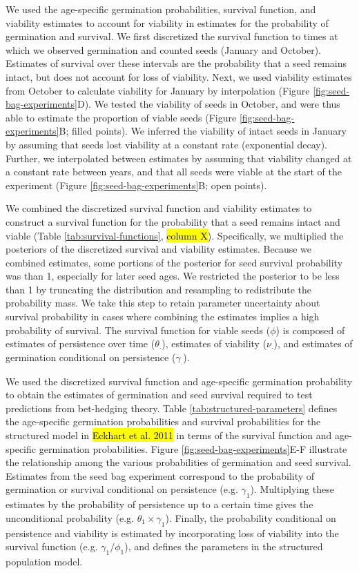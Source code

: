 \documentclass[12pt, oneside, titlepage]{article}   	%
\begin{document}
We used the age-specific germination probabilities, survival function, and viability estimates to account for viability in estimates for the probability of germination and survival. We first discretized the survival function to times at which we observed germination and counted seeds (January and October). Estimates of survival over these intervals are the probability that a seed remains intact, but does not account for loss of viability. Next, we used viability estimates from October to calculate viability for January by interpolation (Figure \ref{fig:seed-bag-experiments}D). We tested the viability of seeds in October, and were thus able to estimate the proportion of viable seeds (Figure \ref{fig:seed-bag-experiments}B; filled points). We inferred the viability of intact seeds in January by assuming that seeds lost viability at a constant rate (exponential decay). Further, we interpolated between estimates by assuming that viability changed at a constant rate between years, and that all seeds were viable at the start of the experiment (Figure \ref{fig:seed-bag-experiments}B; open points). 

We combined the discretized survival function and viability estimates to construct a survival function for the probability that a seed remains intact and viable (Table \ref{tab:survival-functions}, \hl{column X}). Specifically, we multiplied the posteriors of the discretized survival and viability estimates. Because we combined estimates, some portions of the posterior for seed survival probability was than 1, especially for later seed ages. We restricted the posterior to be less than 1 by truncating the distribution and resampling to redistribute the probability mass. We take this step to retain parameter uncertainty about survival probability in cases where combining the estimates implies a high probability of survival. The survival function for viable seeds ($\phi$) is composed of estimates of persistence over time ($\theta_\cdot$), estimates of viability ($\nu_\cdot$), and estimates of germination conditional on persistence ($\gamma_\cdot$).

We used the discretized survival function and age-specific germination probability to obtain the estimates of germination and seed survival required to test predictions from bet-hedging theory. Table \ref{tab:structured-parameters} defines the age-specific germination probabilities and survival probabilities for the structured model in \hl{Eckhart et al. 2011} in terms of the survival function and age-specific germination probabilities. Figure \ref{fig:seed-bag-experiments}E-F illustrate the relationship among the various probabilities of germination and seed survival. Estimates from the seed bag experiment correspond to the probability of germination or survival conditional on persistence (e.g. $\gamma_1$). Multiplying these estimates by the probability of persistence up to a certain time gives the unconditional probability (e.g. $\theta_1 \times \gamma_1$). Finally, the probability conditional on persistence and viability is estimated by incorporating loss of viability into the survival function (e.g. $\gamma_1 / \phi_1$), and defines the parameters in the structured population model.
\end{document}
